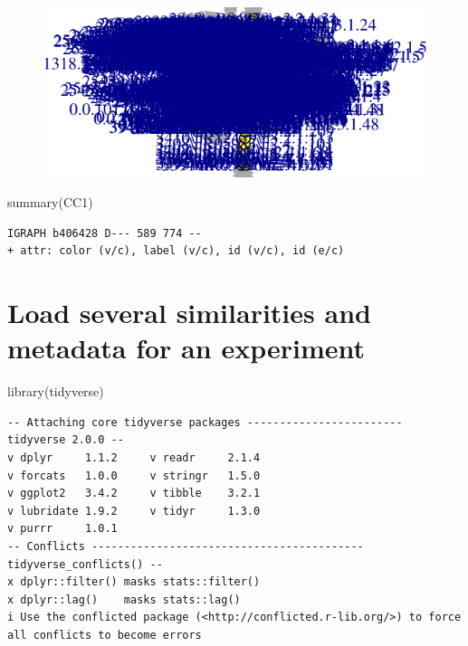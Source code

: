 \documentclass[
  letterpaper,
  DIV=11,
  numbers=noendperiod]{scrreprt}
\newenvironment{Shaded}{\begin{snugshade}}{\end{snugshade}}
\newcommand{\FunctionTok}[1]{\textcolor[rgb]{0.28,0.35,0.67}{#1}}
\newcommand{\NormalTok}[1]{\textcolor[rgb]{0.00,0.23,0.31}{#1}}
\begin{document}
\begin{figure}[H]

{\centering \includegraphics{./data_load_files/figure-pdf/unnamed-chunk-13-1.pdf}

}

\end{figure}

\begin{Shaded}
\begin{Highlighting}[]
\FunctionTok{summary}\NormalTok{(CC1)}
\end{Highlighting}
\end{Shaded}

\begin{verbatim}
IGRAPH b406428 D--- 589 774 -- 
+ attr: color (v/c), label (v/c), id (v/c), id (e/c)
\end{verbatim}


\hypertarget{load-several-similarities-and-metadata-for-an-experiment}{%
\chapter{Load several similarities and metadata for an
experiment}\label{load-several-similarities-and-metadata-for-an-experiment}}

\begin{Shaded}
\begin{Highlighting}[]
\FunctionTok{library}\NormalTok{(tidyverse)}
\end{Highlighting}
\end{Shaded}

\begin{verbatim}
-- Attaching core tidyverse packages ------------------------ tidyverse 2.0.0 --
v dplyr     1.1.2     v readr     2.1.4
v forcats   1.0.0     v stringr   1.5.0
v ggplot2   3.4.2     v tibble    3.2.1
v lubridate 1.9.2     v tidyr     1.3.0
v purrr     1.0.1     
-- Conflicts ------------------------------------------ tidyverse_conflicts() --
x dplyr::filter() masks stats::filter()
x dplyr::lag()    masks stats::lag()
i Use the conflicted package (<http://conflicted.r-lib.org/>) to force all conflicts to become errors
\end{verbatim}
\end{document}
